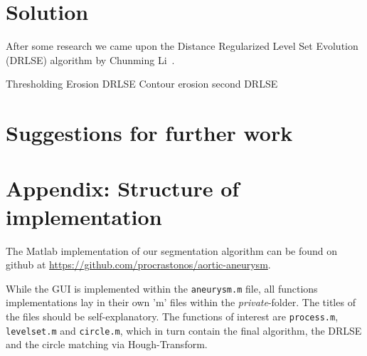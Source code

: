 \documentclass[a4paper]{scrartcl}
\begin{document}
\section*{Solution}

After some research we came upon the Distance Regularized Level Set Evolution
(DRLSE) algorithm by Chunming Li~\cite{Li_TIP08}.

Thresholding
Erosion
DRLSE
Contour erosion
second DRLSE

\section*{Suggestions for further work}

\section*{Appendix: Structure of implementation}

The Matlab implementation of our segmentation algorithm can be found on github
at \url{https://github.com/procrastonos/aortic-aneurysm}.

While the GUI is implemented within the \texttt{aneurysm.m} file, all functions
implementations lay in their own 'm' files within the \emph{private}-folder.
The titles of the files should be self-explanatory. The functions of interest
are \texttt{process.m}, \texttt{levelset.m} and \texttt{circle.m}, which in
turn contain the final algorithm, the DRLSE and the circle matching via
Hough-Transform.



\end{document}

